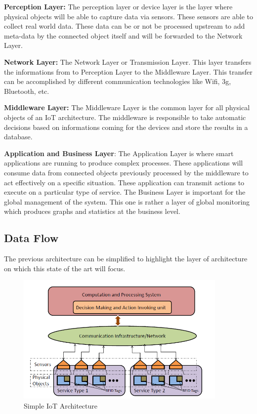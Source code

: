 \documentclass[11pt]{article}
\begin{document}
\textbf{Perception Layer:} The perception layer or device layer is the layer where physical objects will be able to capture data via sensors. These sensors are able to collect real world data. These data can be or not be processed upstream to add meta-data by the connected object itself and will be forwarded to the Network Layer.

\textbf{Network Layer:} The Network Layer or Transmission Layer. This layer transfers the informations from to Perception Layer to the Middleware Layer. This transfer can be accomplished by different communication technologies like Wifi, 3g, Bluetooth, etc.

\textbf{Middleware Layer:} The Middleware Layer is the common layer for all physical objects of an IoT architecture. The middleware is responsible to take automatic decisions based on informations coming for the devices and store the results in a database. 

\textbf{Application and Business Layer}: The Application Layer is where smart applications are running to produce complex processes. These applications will consume data from connected objects previously processed by the middleware to act effectively on a specific situation. These application can transmit actions to execute on a particular type of service. The Business Layer is important for the global management of the system. This one is rather a layer of global monitoring which produces graphs and statistics at the business level.

\subsection{Data Flow}

The previous architecture can be simplified to highlight the layer of architecture on which this state of the art will focus.
\newline
\begin{figure}[h]
	\includegraphics[width=\textwidth,height=180pt]{assets/Basic_IOT_Architecture.png} 
	\caption{Simple IoT Architecture}
	\label{fig:simpleArchitecture}
\end{figure}
\end{document}
